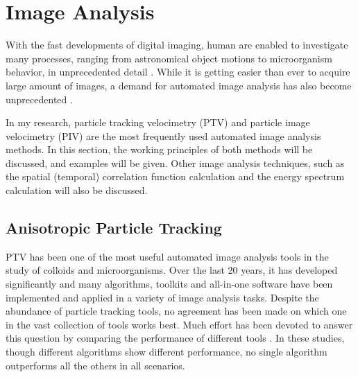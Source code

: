 \section{Image Analysis}
\label{sec:image-analysis}
With the fast developments of digital imaging, human are enabled to investigate many processes, ranging from astronomical object motions to microorganism behavior, in unprecedented detail \cite{Kalaidzidis2007}. While it is getting easier than ever to acquire large amount of images, a demand for automated image analysis has also become unprecedented \cite{Meijering2006, Jaqaman2008, Rohr2010}.

In my research, particle tracking velocimetry (PTV) and particle image velocimetry (PIV) are the most frequently used automated image analysis methods. In this section, the working principles of both methods will be discussed, and examples will be given. Other image analysis techniques, such as the spatial (temporal) correlation function calculation and the energy spectrum calculation will also be discussed.


\subsection{Anisotropic Particle Tracking}
PTV has been one of the most useful automated image analysis tools in the study of colloids and microorganisms. Over the last 20 years, it has developed significantly and many algorithms, toolkits and all-in-one software have been implemented and applied in a variety of image analysis tasks. Despite the abundance of particle tracking tools, no agreement has been made on which one in the vast collection of tools works best. Much effort has been devoted to answer this question by comparing the performance of different tools \cite{Kalaidzidis2007, Dorn2008, Meijering2009, Smal2010, Meijering2012,
Chenouard2014, Maska2014, Hilsenbeck2016}. In these studies, though different algorithms show different performance, no single algorithm outperforms all the others in all scenarios.

